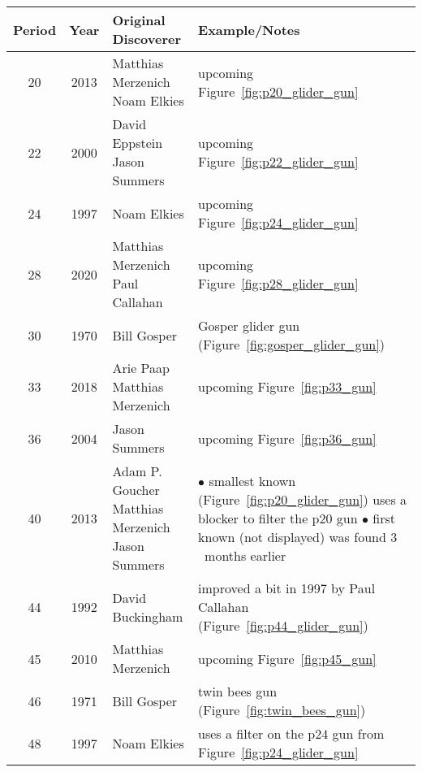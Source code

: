 \begin{table}[!htbp]\vspace*{0.02in}
	\begin{center}		
		\begin{tabular}{ccll}
			\toprule
			Period & Year & Original Discoverer & Example/Notes \\ \midrule
			20 & 2013 & \specialcelll[t]{Matthias Merzenich \\ Noam Elkies} & upcoming Figure~\ref{fig:p20_glider_gun} \\
			\rowcolor{gray!20} 22 & 2000 & \specialcelll[t]{David Eppstein \\ Jason Summers} & upcoming Figure~\ref{fig:p22_glider_gun} \\
			24 & 1997 & Noam Elkies & upcoming Figure~\ref{fig:p24_glider_gun} \\
			\rowcolor{gray!20} 28 & 2020 & \specialcelll[t]{Matthias Merzenich \\ Paul Callahan} & upcoming Figure~\ref{fig:p28_glider_gun} \\
			30 & 1970 & Bill Gosper & Gosper glider gun (Figure~\ref{fig:gosper_glider_gun}) \\
			\rowcolor{gray!20} 33 & 2018 & \specialcelll[t]{Arie Paap \\ Matthias Merzenich} & upcoming Figure~\ref{fig:p33_gun} \\
			36 & 2004 & Jason Summers & upcoming Figure~\ref{fig:p36_gun} \\
			\rowcolor{gray!20} 40 & 2013 & \specialcelll[t]{Adam P. Goucher \\ Matthias Merzenich \\ Jason Summers} & \specialcelll[t]{{\small$\bullet$} smallest known (Figure~\ref{fig:p20_glider_gun}) uses a blocker to \\ \hphantom{\small$\bullet$} filter the p$20$ gun \\ {\small$\bullet$} first known (not displayed) was found $3$~months earlier} \\
			44 & 1992 & David Buckingham & improved a bit in 1997 by Paul Callahan (Figure~\ref{fig:p44_glider_gun}) \\
			\rowcolor{gray!20} 45 & 2010 & Matthias Merzenich & upcoming Figure~\ref{fig:p45_gun} \\
			46 & 1971 &	Bill Gosper & twin bees gun (Figure~\ref{fig:twin_bees_gun}) \\
			\rowcolor{gray!20} 48 & 1997 & Noam Elkies & uses a filter on the p$24$ gun from Figure~\ref{fig:p24_glider_gun} \\

\end{tabular}
\end{center}
\end{table}
